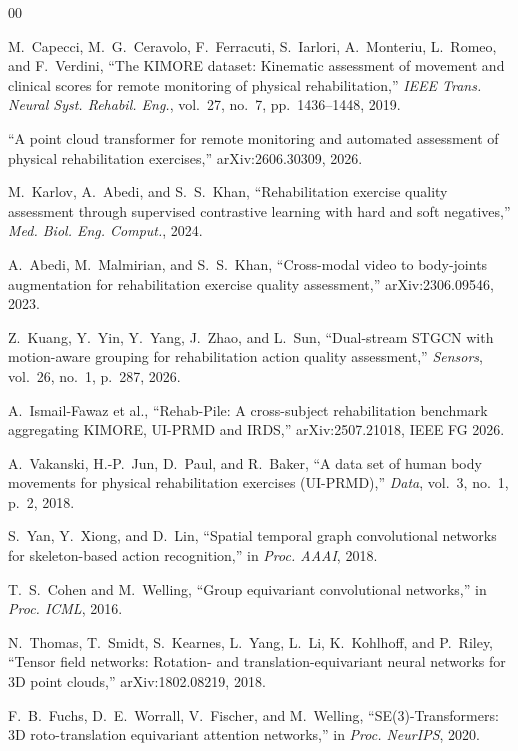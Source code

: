 \documentclass[10pt,journal]{IEEEtran}
\begin{document}
\begin{thebibliography}{00}

M.~Capecci, M.~G.~Ceravolo, F.~Ferracuti, S.~Iarlori, A.~Monteriu, L.~Romeo, and F.~Verdini,
``The KIMORE dataset: Kinematic assessment of movement and clinical scores for remote monitoring of physical rehabilitation,''
\textit{IEEE Trans. Neural Syst. Rehabil. Eng.}, vol.~27, no.~7, pp.~1436--1448, 2019.

``A point cloud transformer for remote monitoring and automated assessment of physical rehabilitation exercises,''
arXiv:2606.30309, 2026.

M.~Karlov, A.~Abedi, and S.~S.~Khan,
``Rehabilitation exercise quality assessment through supervised contrastive learning with hard and soft negatives,''
\textit{Med. Biol. Eng. Comput.}, 2024.

A.~Abedi, M.~Malmirian, and S.~S.~Khan,
``Cross-modal video to body-joints augmentation for rehabilitation exercise quality assessment,''
arXiv:2306.09546, 2023.

Z.~Kuang, Y.~Yin, Y.~Yang, J.~Zhao, and L.~Sun,
``Dual-stream STGCN with motion-aware grouping for rehabilitation action quality assessment,''
\textit{Sensors}, vol.~26, no.~1, p.~287, 2026.

A.~Ismail-Fawaz et al.,
``Rehab-Pile: A cross-subject rehabilitation benchmark aggregating KIMORE, UI-PRMD and IRDS,''
arXiv:2507.21018, IEEE FG 2026.

A.~Vakanski, H.-P.~Jun, D.~Paul, and R.~Baker,
``A data set of human body movements for physical rehabilitation exercises (UI-PRMD),''
\textit{Data}, vol.~3, no.~1, p.~2, 2018.

S.~Yan, Y.~Xiong, and D.~Lin,
``Spatial temporal graph convolutional networks for skeleton-based action recognition,''
in \textit{Proc. AAAI}, 2018.

T.~S.~Cohen and M.~Welling,
``Group equivariant convolutional networks,''
in \textit{Proc. ICML}, 2016.

N.~Thomas, T.~Smidt, S.~Kearnes, L.~Yang, L.~Li, K.~Kohlhoff, and P.~Riley,
``Tensor field networks: Rotation- and translation-equivariant neural networks for 3D point clouds,''
arXiv:1802.08219, 2018.

F.~B.~Fuchs, D.~E.~Worrall, V.~Fischer, and M.~Welling,
``SE(3)-Transformers: 3D roto-translation equivariant attention networks,''
in \textit{Proc. NeurIPS}, 2020.


\end{thebibliography}
\end{document}
